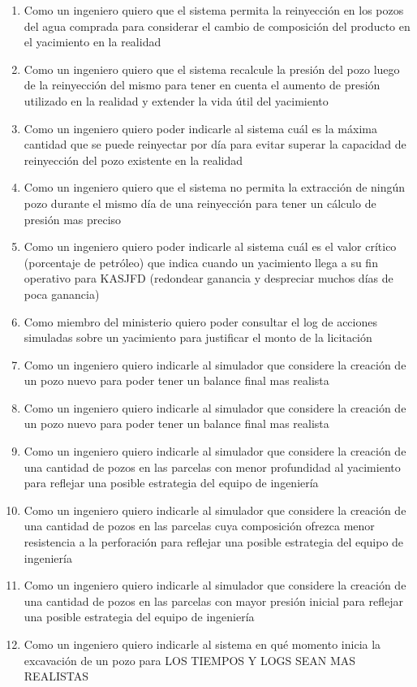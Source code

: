 \begin{enumerate}
  \item Como un ingeniero quiero que el sistema permita la reinyección en los pozos del agua comprada para considerar el cambio de composición del producto en el yacimiento en la realidad
  \item Como un ingeniero quiero que el sistema recalcule la presión del pozo luego de la reinyección del mismo para tener en cuenta el aumento de presión utilizado en la realidad y extender la vida útil del yacimiento
  \item Como un ingeniero quiero poder indicarle al sistema cuál es la máxima cantidad que se puede reinyectar por día para evitar superar la capacidad de reinyección del pozo existente en la realidad
  \item Como un ingeniero quiero que el sistema no permita la extracción de ningún pozo durante el mismo día de una reinyección para tener un cálculo de presión mas preciso
  \item Como un ingeniero quiero poder indicarle al sistema cuál es el valor crítico (porcentaje de petróleo) que indica cuando un yacimiento llega a su fin operativo para KASJFD (redondear ganancia y despreciar muchos días de poca ganancia)
  \item Como miembro del ministerio quiero poder consultar el log de acciones simuladas sobre un yacimiento para justificar el monto de la licitación
  \item Como un ingeniero quiero indicarle al simulador que considere la creación de un pozo nuevo para poder tener un balance final mas realista
  \item Como un ingeniero quiero indicarle al simulador que considere la creación de un pozo nuevo para poder tener un balance final mas realista
  \item Como un ingeniero quiero indicarle al simulador que considere la creación de una cantidad de pozos en las parcelas con menor profundidad al yacimiento para reflejar una posible estrategia del equipo de ingeniería
  \item Como un ingeniero quiero indicarle al simulador que considere la creación de una cantidad de pozos en las parcelas cuya composición ofrezca menor resistencia a la perforación para reflejar una posible estrategia del equipo de ingeniería
  \item Como un ingeniero quiero indicarle al simulador que considere la creación de una cantidad de pozos en las parcelas con mayor presión inicial para reflejar una posible estrategia del equipo de ingeniería
  \item Como un ingeniero quiero indicarle al sistema en qué momento inicia la excavación de un pozo para LOS TIEMPOS Y LOGS SEAN MAS REALISTAS

\end{enumerate}

